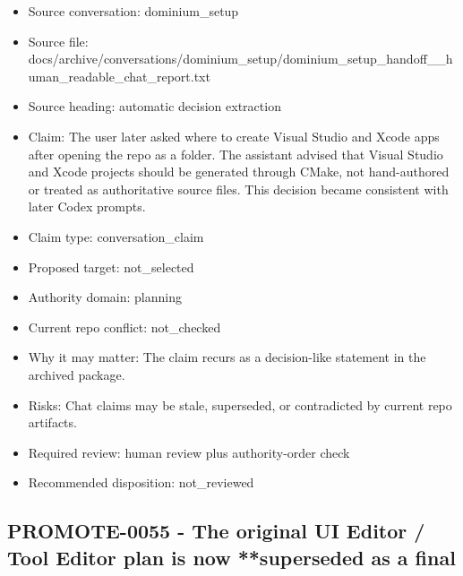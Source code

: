 \documentclass[11pt,a4paper]{report}
\begin{document}
\begin{itemize}
\item Source conversation: dominium\_setup
\item Source file: docs/archive/conversations/dominium\_setup/dominium\_setup\_handoff\_\_human\_readable\_chat\_report.txt
\item Source heading: automatic decision extraction
\item Claim: The user later asked where to create Visual Studio and Xcode apps after opening the repo as a folder. The assistant advised that Visual Studio and Xcode projects should be generated through CMake, not hand-authored or treated as authoritative source files. This decision became consistent with later Codex prompts.
\item Claim type: conversation\_claim
\item Proposed target: not\_selected
\item Authority domain: planning
\item Current repo conflict: not\_checked
\item Why it may matter: The claim recurs as a decision-like statement in the archived package.
\item Risks: Chat claims may be stale, superseded, or contradicted by current repo artifacts.
\item Required review: human review plus authority-order check
\item Recommended disposition: not\_reviewed
\end{itemize}

\subsection{PROMOTE-0055 - The original UI Editor / Tool Editor plan is now **superseded as a final}
\end{document}
